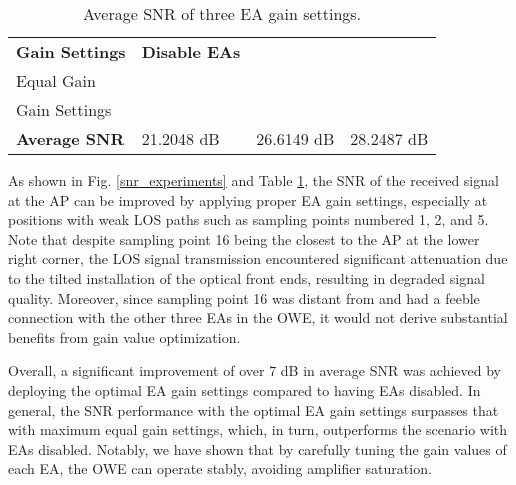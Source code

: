 \begin{table}
\centering
\begin{tabularx}{0.48\textwidth}{p{1.8cm} p{1.7cm} X X}
\toprule
\textbf{Gain Settings} &
  \textbf{Disable EAs} &
  \textbf{\begin{tabular}[c]{@{}l@{}}Maximum\\ Equal Gain\end{tabular}} &
  \textbf{\begin{tabular}[c]{@{}l@{}}Optimal\\ Gain Settings\end{tabular}} \\ \midrule
\textbf{Average SNR} &
  21.2048   dB &
  26.6149   dB &
  28.2487   dB \\ \bottomrule
\end{tabularx}
\caption{Average SNR of three EA gain settings.}
\label{average_snr}
\vspace{-0.5cm}
\end{table}
\par
As shown in Fig. \ref{snr_experiments} and Table \ref{average_snr}, the SNR of the received signal at the AP can be improved by applying proper EA gain settings, especially at positions with weak LOS paths such as sampling points numbered 1, 2, and 5.
Note that despite sampling point 16 being the closest to the AP at the lower right corner, the LOS signal transmission encountered significant attenuation due to the tilted installation of the optical front ends, resulting in degraded signal quality. Moreover, since sampling point 16 was distant from and had a feeble connection with the other three EAs in the OWE, it would not derive substantial benefits from gain value optimization.
\par
Overall, a significant improvement of over 7 dB in average SNR was achieved by deploying the optimal EA gain settings compared to having EAs disabled. In general, the SNR performance with the optimal EA gain settings surpasses that with maximum equal gain settings, which, in turn, outperforms the scenario with EAs disabled.  Notably, we have shown that by carefully tuning the gain values of each EA, the OWE can operate stably, avoiding amplifier saturation.

